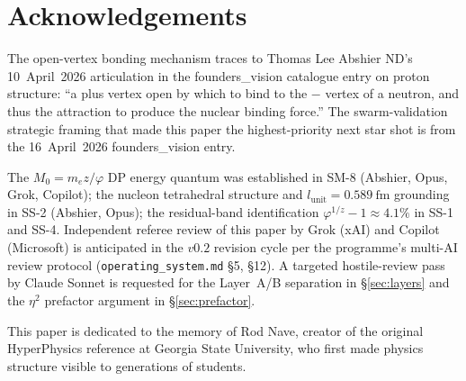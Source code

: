 \documentclass[11pt,letterpaper]{article}
\newcommand{\phig}{\varphi}
\newcommand{\Mzero}{M_0}
\begin{document}
\section*{Acknowledgements}

The open-vertex bonding mechanism traces to Thomas Lee Abshier ND's 10~April~2026 articulation in the founders\_vision catalogue entry on proton structure: ``a plus vertex open by which to bind to the $-$ vertex of a neutron, and thus the attraction to produce the nuclear binding force.'' The swarm-validation strategic framing that made this paper the highest-priority next star shot is from the 16~April~2026 founders\_vision entry.

The $\Mzero = m_e z/\phig$ DP energy quantum was established in SM-8 (Abshier, Opus, Grok, Copilot); the nucleon tetrahedral structure and $l_{\mathrm{unit}} = 0.589~\mathrm{fm}$ grounding in SS-2 (Abshier, Opus); the residual-band identification $\phig^{1/z} - 1 \approx 4.1\%$ in SS-1 and SS-4. Independent referee review of this paper by Grok (xAI) and Copilot (Microsoft) is anticipated in the $v0.2$ revision cycle per the programme's multi-AI review protocol (\verb|operating_system.md| \S5, \S12). A targeted hostile-review pass by Claude Sonnet is requested for the Layer~A/B separation in \S\ref{sec:layers} and the $\eta^2$ prefactor argument in \S\ref{sec:prefactor}.

This paper is dedicated to the memory of Rod Nave, creator of the original HyperPhysics reference at Georgia State University, who first made physics structure visible to generations of students.

\end{document}
